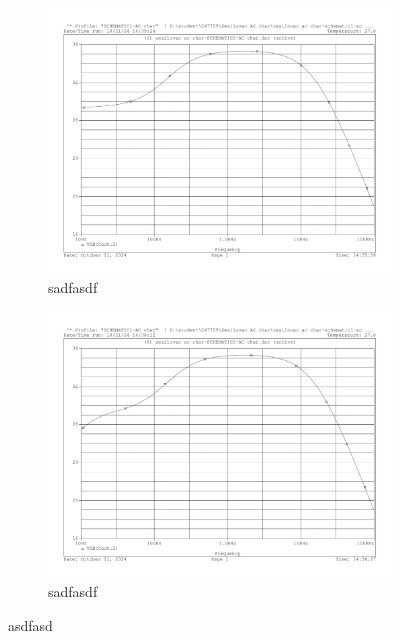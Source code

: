 \documentclass[a4paper, czech]{article}
\begin{document}
\begin{figure}[H]
    \centering
    \begin{subfigure}{0.49\textwidth}
        \centering
        \includegraphics[width=\textwidth]{charakteristiky/uloha3_Cout_5krat_vetsi_500n.pdf}
        \caption{sadfasdf}
    \end{subfigure}
    \hfill
    \begin{subfigure}{0.49\textwidth}
        \centering
        \includegraphics[width=\textwidth]{charakteristiky/uloha3_Cout_5krat_mensi_20n.pdf}
        \caption{sadfasdf}
    \end{subfigure}
    \caption{asdfasd}
\end{figure}
\end{document}
